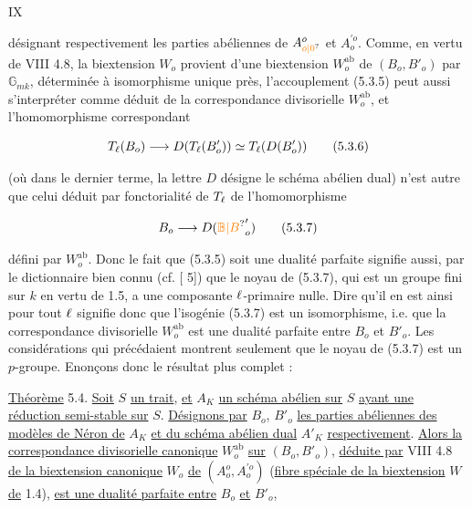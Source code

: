 
\hfill IX

désignant respectivement les parties abéliennes de $A_{\unsure{o|0}}^o$ et $A^{\prime o}_o$. Comme, en vertu de VIII 4.8, la biextension $W_o$ provient d'une biextension $W_o^{\mathrm{ab}}$ de $(B_o,B'_o)$ par $\mathbb{G}_{mk}$, déterminée à isomorphisme unique près, l'accouplement (5.3.5) peut aussi s'interpréter comme déduit de la correspondance divisorielle $W_o^{\mathrm{ab}}$, et l'homomorphisme correspondant

\[
T_{\ell}(B_o)\longrightarrow D(T_{\ell}(B'_o))\simeq T_{\ell}(D(B'_o))\tag*{(5.3.6)}
\]

(où dans le dernier terme, la lettre $D$ désigne le schéma abélien dual) n'est autre que celui déduit par fonctorialité de $T_{\ell}$ de l'homomorphisme

\[
B_o \handwritten{\longrightarrow} D(\unsure{\mathbb{B}|B}'_o)\tag*{(5.3.7)}
\]

défini par $W_o^{\mathrm{ab}}$. Donc le fait que (5.3.5) soit une dualité parfaite signifie aussi, par le dictionnaire bien connu (cf. [ 5]) que le noyau de (5.3.7), qui est un groupe fini sur $k$ en vertu de 1.5, a une composante $\ell$-primaire nulle. Dire qu'il en est ainsi pour tout $\ell$ signifie donc que l'isogénie (5.3.7) est un isomorphisme, i.e. que la correspondance divisorielle $W_o^{\mathrm{ab}}$ est une dualité parfaite entre $B_o$ et $B'_o$. Les considérations qui précédaient montrent seulement que le noyau de (5.3.7) est un $p$-groupe. Enonçons donc le résultat plus complet :

\uline{Théorème} 5.4. \uline{Soit} $S$ \uline{un trait}, \uline{et} $A_K$ \uline{un schéma abélien sur} $S$ \uline{ayant une réduction semi-stable sur} $S$. \uline{Désignons par} $B_o$, $B'_o$ \uline{les parties abéliennes des modèles de Néron de} $A_K$ \uline{et du schéma abélien dual} $A'_K$ \uline{respectivement}. \uline{Alors la correspondance divisorielle canonique} $W_o^{\mathrm{ab}}$ \uline{sur} $(B_o,B'_o)$, \uline{déduite par} VIII 4.8 \uline{de la biextension canonique} $W_o$ \uline{de} $(A_o^o,A^{\prime o}_o)$ (\uline{fibre spéciale de la biextension} $W$ \uline{de} 1.4), \uline{est une dualité parfaite entre} $B_o$ \uline{et} $B'_o$,


